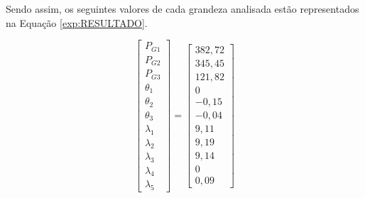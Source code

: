 	Sendo assim, os seguintes valores de cada grandeza analisada estão representados na Equação \ref{exp:RESULTADO}.
	
	\begin{equation}
		\begin{bmatrix}
       P_{G1} \\P_{G2} \\P_{G3} \\\theta{_1} \\\theta{_2} \\\theta{_3} \\\lambda{_1} \\\lambda{_2} \\\lambda{_3} \\\lambda{_4} \\\lambda{_5}\end{bmatrix} = 
       \begin{bmatrix}
        382,72\\
       	345,45\\
       	121,82\\
       	0\\
       	-0,15\\
       	-0,04\\
       	9,11\\
       	9,19\\
       	9,14\\
       	0\\
       	0,09\end{bmatrix}
		\label{exp:RESULTADO}
	\end{equation}
	